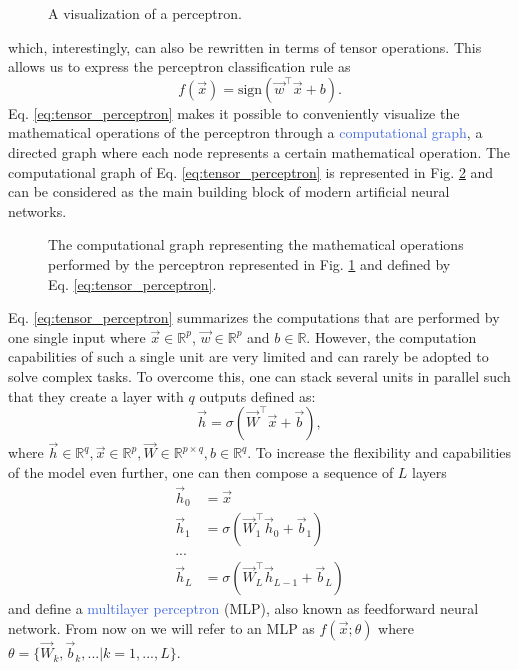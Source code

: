 \begin{figure}[ht!]
	\centering
	
\caption{A visualization of a perceptron.}
\label{fig:perceptron}
\end{figure}
which, interestingly, can also be rewritten in terms of tensor operations. This allows us to express the perceptron classification rule as 
\begin{equation}
	f(\vec{x}) = \text{sign}(\vec{w}^\intercal \vec{x} + b).
	\label{eq:tensor_perceptron}
\end{equation}
Eq. \ref{eq:tensor_perceptron} makes it possible to conveniently visualize the mathematical operations of the perceptron through a \textcolor{RoyalBlue}{computational graph}, a directed graph where each node represents a certain mathematical operation. The computational graph of Eq. \ref{eq:tensor_perceptron} is represented in Fig. \ref{fig:computational_graph_0} and can be considered as the main building block of modern artificial neural networks.
\begin{figure}[ht!]
	\centering
	
	\caption{The computational graph representing the mathematical operations performed by the perceptron represented in Fig. \ref{fig:perceptron} and defined by Eq. \ref{eq:tensor_perceptron}.}
\label{fig:computational_graph_0}
\end{figure}

Eq. \ref{eq:tensor_perceptron} summarizes the computations that are performed by one single input where $\vec{x}\in\mathds{R}^{p}$, $\vec{w}\in\mathds{R}^{p}$ and $b\in\mathds{R}$. However, the computation capabilities of such a single unit are very limited and can rarely be adopted to solve complex tasks. To overcome this, one can stack several units in parallel such that they create a layer with $q$ outputs defined as:
\begin{equation}
	\vec{h} = \sigma(\vec{W}^\intercal\vec{x}+\vec{b}),
\end{equation}
where $\vec{h}\in\mathds{R}^{q},\vec{x}\in\mathds{R}^{p},\vec{W}\in\mathds{R}^{p\times q},b\in\mathds{R}^{q}$. To increase the flexibility and capabilities of the model even further, one can then compose a sequence of $L$ layers
\begin{equation}
	\begin{split}
		\vec{h}_0 & = \vec{x} \\ 
		\vec{h}_1 & = \sigma(\vec{W}^{\intercal}_{1}\vec{h}_0 + \vec{b}_1) \\ 
	... \\
		\vec{h}_L & = \sigma(\vec{W}^{\intercal}_{L}\vec{h}_{L-1}+\vec{b}_{L})
	\end{split}
\end{equation}
and define a \textcolor{RoyalBlue}{multilayer perceptron} (MLP), also known as feedforward neural network. From now on we will refer to an MLP as $f(\vec{x};\theta)$ where $\theta=\{\vec{W}_k,\vec{b}_k,...|k=1,...,L\}$. 

